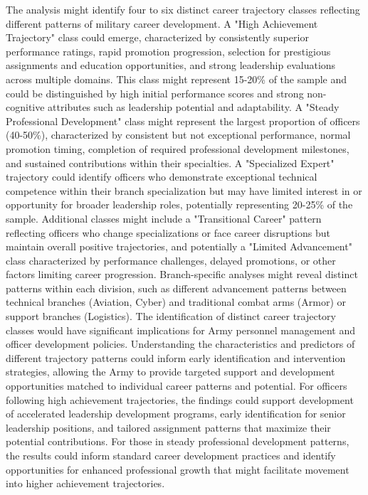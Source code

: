 \documentclass[main.tex]{subfiles}
\begin{document}
The analysis might identify four to six distinct career trajectory classes reflecting different patterns of military career development. A "High Achievement Trajectory" class could emerge, characterized by consistently superior performance ratings, rapid promotion progression, selection for prestigious assignments and education opportunities, and strong leadership evaluations across multiple domains. This class might represent 15-20\% of the sample and could be distinguished by high initial performance scores and strong non-cognitive attributes such as leadership potential and adaptability.
A "Steady Professional Development" class might represent the largest proportion of officers (40-50\%), characterized by consistent but not exceptional performance, normal promotion timing, completion of required professional development milestones, and sustained contributions within their specialties. A "Specialized Expert" trajectory could identify officers who demonstrate exceptional technical competence within their branch specialization but may have limited interest in or opportunity for broader leadership roles, potentially representing 20-25\% of the sample.
Additional classes might include a "Transitional Career" pattern reflecting officers who change specializations or face career disruptions but maintain overall positive trajectories, and potentially a "Limited Advancement" class characterized by performance challenges, delayed promotions, or other factors limiting career progression. Branch-specific analyses might reveal distinct patterns within each division, such as different advancement patterns between technical branches (Aviation, Cyber) and traditional combat arms (Armor) or support branches (Logistics).
The identification of distinct career trajectory classes would have significant implications for Army personnel management and officer development policies. Understanding the characteristics and predictors of different trajectory patterns could inform early identification and intervention strategies, allowing the Army to provide targeted support and development opportunities matched to individual career patterns and potential.
For officers following high achievement trajectories, the findings could support development of accelerated leadership development programs, early identification for senior leadership positions, and tailored assignment patterns that maximize their potential contributions. For those in steady professional development patterns, the results could inform standard career development practices and identify opportunities for enhanced professional growth that might facilitate movement into higher achievement trajectories.
\end{document}
